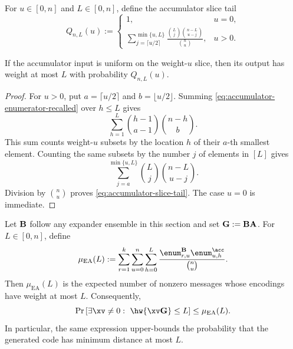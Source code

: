 For $u\in[0,n]$ and $L\in[0,n]$, define the accumulator slice tail
\begin{equation}
 Q_{n,L}(u):=
 \begin{cases}
  1,&u=0,\\[2mm]
  \displaystyle
  \sum_{j=\lceil u/2\rceil}^{\min\{u,L\}}
  \frac{\binom{L}{j}\binom{n-L}{u-j}}{\binom{n}{u}},&u>0.
 \end{cases}
 \label{eq:accumulator-slice-tail}
\end{equation}

\begin{lemma}
\label{lem:accumulator-slice-tail}
If the accumulator input is uniform on the weight-$u$ slice, then its output
has weight at most $L$ with probability $Q_{n,L}(u)$.
\end{lemma}

\begin{proof}
For $u>0$, put $a=\lceil u/2\rceil$ and $b=\lfloor u/2\rfloor$.
Summing \eqref{eq:accumulator-enumerator-recalled} over $h\leq L$ gives
\[
 \sum_{h=1}^{L}\binom{h-1}{a-1}\binom{n-h}{b}.
\]
This sum counts weight-$u$ subsets by the location $h$ of their $a$-th
smallest element.  Counting the same subsets by the number $j$ of elements
in $[L]$ gives
\[
 \sum_{j=a}^{\min\{u,L\}}\binom{L}{j}\binom{n-L}{u-j}.
\]
Division by $\binom{n}{u}$ proves
\eqref{eq:accumulator-slice-tail}.  The case $u=0$ is immediate.
\end{proof}

\begin{theorem}
\label{thm:expand-accumulate-first-moment}
Let $\mathbf B$ follow any expander ensemble in this section and set $\mathbf G:=\mathbf B\mathbf A$.
For $L\in[0,n]$, define
\begin{equation}
 \mu_{\mathrm{EA}}(L)
   :=
 \sum_{r=1}^{k}\sum_{u=0}^{n}\sum_{h=0}^{L}
 \frac{\enum^{\B}_{r,u}\enum^{\acc}_{u,h}}{\binom{n}{u}}.
 \label{eq:expand-accumulate-first-moment}
\end{equation}
Then $\mu_{\mathrm{EA}}(L)$ is the expected number of nonzero messages whose
encodings have weight at most $L$.  Consequently,
\begin{equation}
 \Pr\left[\exists\xv\neq 0:\ \hw{\xv\G}\leq L\right]
 \leq \mu_{\mathrm{EA}}(L).
 \label{eq:expand-accumulate-failure}
\end{equation}
In particular, the same expression upper-bounds the probability that the
generated code has minimum distance at most $L$.
\end{theorem}

